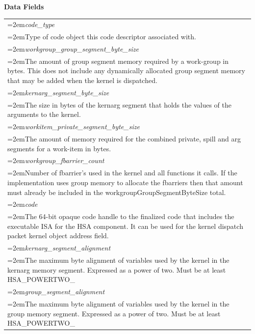 \documentclass[final]{book}
\newcommand{\reffld}[1]{\textit{#1}}
\begin{document}
\noindent\textbf{Data Fields}\\[-6mm]
\begin{longtable}{@{}>{\hangindent=2em}p{\textwidth}}
\reffld{code_\-type}\\\hspace{2em}Type of code object this code descriptor associated with.\\[2mm]
\reffld{workgroup_\-group_\-segment_\-byte_\-size}\\\hspace{2em}The amount of group segment memory required by a work-group in bytes. This does not include any dynamically allocated group segment memory that may be added when the kernel is dispatched.\\[2mm]
\reffld{kernarg_\-segment_\-byte_\-size}\\\hspace{2em}The size in bytes of the kernarg segment that holds the values of the arguments to the kernel.\\[2mm]
\reffld{workitem_\-private_\-segment_\-byte_\-size}\\\hspace{2em}The amount of memory required for the combined private, spill and arg segments for a work-item in bytes.\\[2mm]
\reffld{workgroup_\-fbarrier_\-count}\\\hspace{2em}Number of fbarrier's used in the kernel and all functions it calls. If the implementation uses group memory to allocate the fbarriers then that amount must already be included in the workgroupGroupSegmentByteSize total.\\[2mm]
\reffld{code}\\\hspace{2em}The 64-bit opaque code handle to the finalized code that includes the executable ISA for the HSA component. It can be used for the kernel dispatch packet kernel object address field.\\[2mm]
\reffld{kernarg_\-segment_\-alignment}\\\hspace{2em}The maximum byte alignment of variables used by the kernel in the kernarg memory segment. Expressed as a power of two. Must be at least HSA_\-POWERTWO_\-16\\[2mm]
\reffld{group_\-segment_\-alignment}\\\hspace{2em}The maximum byte alignment of variables used by the kernel in the group memory segment. Expressed as a power of two. Must be at least HSA_\-POWERTWO_\-16\\[2mm]

\end{longtable}
\end{document}
